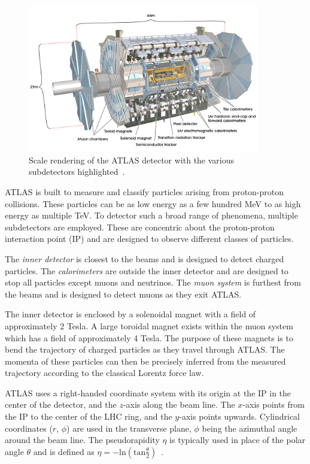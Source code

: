 \begin{figure}[tp]
  \centering
  \includegraphics[width=0.90\textwidth]{figures/lhc-atlas/atlas-0803012_01.jpg}
  \caption{Scale rendering of the ATLAS detector with the various subdetectors highlighted~\cite{atlas-cgi-detector}.}
  \label{fig:atlas-cartoon}
\end{figure}

ATLAS is built to measure and classify particles arising from proton-proton collisions. These particles can be as low energy as a few hundred MeV to as high energy as multiple TeV. To detector such a broad range of phenomena, multiple subdetectors are employed. These are concentric about the proton-proton interaction point (IP) and are designed to observe different classes of particles. 

The \textit{inner detector} is closest to the beams and is designed to detect charged particles. The \textit{calorimeters} are outside the inner detector and are designed to stop all particles except muons and neutrinos. The \textit{muon system} is furthest from the beams and is designed to detect muons as they exit ATLAS. 

The inner detector is enclosed by a solenoidal magnet with a field of approximately 2 Tesla. A large toroidal magnet exists within the muon system which has a field of approximately 4 Tesla. The purpose of these magnets is to bend the trajectory of charged particles as they travel through ATLAS. The momenta of these particles can then be precisely inferred from the measured trajectory according to the classical Lorentz force law.

ATLAS uses a right-handed coordinate system with its origin at the IP in the center of the detector, and the $z$-axis along the beam line. The $x$-axis points from the IP to the center of the LHC ring, and the $y$-axis points upwards. Cylindrical coordinates ($r$, $\phi$) are used in the transverse plane, $\phi$ being the azimuthal angle around the beam line. The pseudorapidity $\eta$ is typically used in place of the polar angle $\theta$ and is defined as $\eta = -\text{ln}(\text{tan}\frac{\theta}{2})$~\cite{HIGG-2012-27}.

